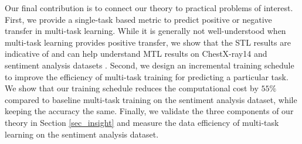 Our final contribution is to connect our theory to practical problems of interest.
First, we provide a single-task based metric to predict positive or negative transfer in multi-task learning.
While it is generally not well-understood when multi-task learning provides positive transfer, we show that the STL results are indicative of and can help understand MTL results on ChestX-ray14 \cite{chexnet17} and sentiment analysis datasets \cite{LZWDA18}.
Second, we design an incremental training schedule to improve the efficiency of multi-task training for predicting a particular task.
We show that our training schedule reduces the computational cost by $55\%$ compared to baseline multi-task training on the sentiment analysis dataset, while keeping the accuracy the same.
Finally, we validate the three components of our theory in Section \ref{sec_insight} and measure the data efficiency of multi-task learning on the sentiment analysis dataset.

